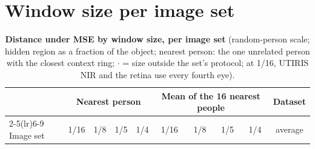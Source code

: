 \section{Window size per image set}
\label{sec:s-rq4}
\begin{table}[htbp]
\centering
\caption{\textbf{Distance under \acs{MSE} by window size, per image set} (random-person scale; hidden region as a fraction of the object; nearest person: the one unrelated person with the closest context ring; $\cdot$ = size outside the set's protocol; at 1/16, UTIRIS \acs{NIR} and the retina use every fourth eye).}
\label{tab:rq4}
\scriptsize
\setlength{\tabcolsep}{1.6pt}
\begin{tabular}{@{}lccccccccc@{}}
\toprule
& \multicolumn{4}{c}{Nearest person} & \multicolumn{4}{c}{Mean of the 16 nearest people} & Dataset \\
\cmidrule(lr){2-5}\cmidrule(lr){6-9}
Image set & 1/16 & 1/8 & 1/5 & 1/4 & 1/16 & 1/8 & 1/5 & 1/4 & average \\
\midrule
\end{tabular}
\end{table}
